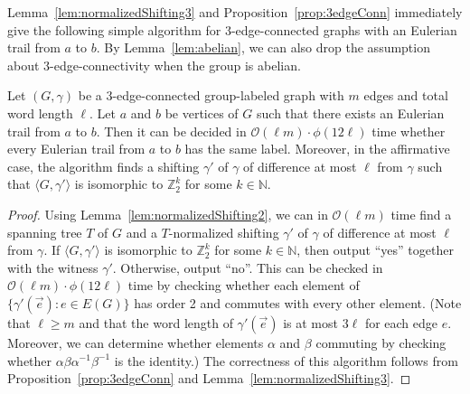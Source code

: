 \documentclass[a4paper, 12pt]{article}
\let\geq\geqslant
\newcommand{\RMM}[1]{\textcolor{orange}{RM: #1}}
\newcommand{\CMin}[1]{\todo[inline,bordercolor=white,color=Magenta,backgroundcolor=CornflowerBlue!40,textcolor=black,size=\footnotesize]{\textsf{CM: #1}}}
\begin{document}
Lemma~\ref{lem:normalizedShifting3} and Proposition~\ref{prop:3edgeConn} immediately give the following simple algorithm for 3-edge-connected graphs with an Eulerian trail from $a$ to $b$. By Lemma~\ref{lem:abelian}, we can also drop the assumption about $3$-edge-connectivity when the group is abelian.


\begin{proposition}
\label{prop:algorithm3-edge-conn}
    Let $(G, \gamma)$ be a $3$-edge-connected group-labeled graph with $m$ edges and total word length $\ell$. Let $a$ and $b$ be vertices of $G$ such that there exists an Eulerian trail from $a$ to $b$. Then it can be decided in $\mathcal{O}(\ell m)\cdot \phi(12\ell)$ time whether every Eulerian trail from $a$ to $b$ has the same label. Moreover, in the affirmative case, the algorithm finds a shifting $\gamma'$ of $\gamma$ of difference at most $\ell$ from $\gamma$ such that $\langle G, \gamma'\rangle$ is isomorphic to $\mathbb{Z}_2^k$ for some $k\in \mathbb{N}$.
\end{proposition}
\begin{proof}
    Using Lemma~\ref{lem:normalizedShifting2}, we can in $\mathcal{O}(\ell m)$ time find a spanning tree $T$ of $G$ and a $T$-normalized shifting $\gamma'$ of $\gamma$ of difference at most $\ell$ from $\gamma$. If $\langle G, \gamma'\rangle$ is isomorphic to $\mathbb{Z}_2^k$ for some $k\in \mathbb{N}$, then output ``yes'' together with the witness $\gamma'$. Otherwise, output ``no''. This can be checked in $\mathcal{O}(\ell m)\cdot \phi(12\ell)$ time by checking whether each element of $\{\gamma'(\vec{e}) : e \in E(G)\}$ has order 2 and commutes with every other element. (Note that $\ell \geq m$ and that the word length of $\gamma'(\vec{e})$ is at most $3\ell$ for each edge $e$. Moreover, we can determine whether elements $\alpha$ and $\beta$ commuting by checking whether $\alpha\beta \alpha^{-1}\beta^{-1}$ is the identity.) The correctness of this algorithm follows from Proposition~\ref{prop:3edgeConn} and Lemma~\ref{lem:normalizedShifting3}.
\end{proof}
\end{document}
